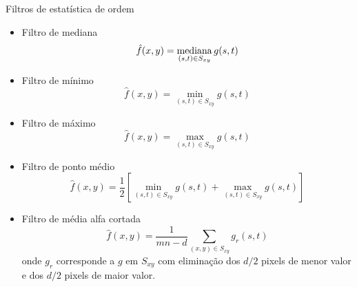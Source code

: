 \begin{slide}{Filtros de estatística de ordem}
	\twocolumn
	{
		\begin{itemize}
			\item Filtro de mediana
				\begin{equation*}
					\hat f(x,y) = \operatorname*{mediana}_{(s,t)\in S_{xy} }g(s,t)
				\end{equation*}
			\item Filtro de mínimo
				\begin{equation*}
					\hat f(x,y) = \min_{(s,t)\in S_{xy} }g(s,t)
				\end{equation*}
			\item Filtro de máximo
				\begin{equation*}
					\hat f(x,y) = \max_{(s,t)\in S_{xy} }g(s,t)
				\end{equation*}
		\end{itemize}
	}
	{
		\begin{itemize}
			\item Filtro de ponto médio
				\begin{equation*}
					\hat f(x,y) = \frac{1}{2}\left [\min_{(s,t)\in S_{xy} }g(s,t)+\max_{(s,t)\in S_{xy} }g(s,t)\right ]
				\end{equation*}
			\item Filtro de média alfa cortada
				\begin{equation*}
					\hat f(x,y) = \frac{1}{mn-d}\sum_{(x,y)\in S_{xy}}g_r(s,t)
				\end{equation*}
				onde $g_r$ corresponde a $g$ em $S_{xy}$ com eliminação dos $d/2$ pixels de menor valor e dos $d/2$ pixels de maior valor.
		\end{itemize}

	}
\end{slide}


